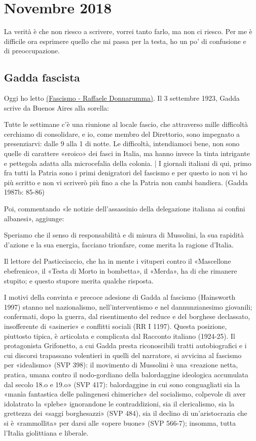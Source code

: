 \section{Novembre 2018}
La verità è che non riesco a scrivere, vorrei tanto farlo, ma non ci riesco. Per me è difficile ora esprimere quello che mi passa per la testa, ho un po' di confusione e di preoccupazione.
\newline
\subsection{Gadda fascista}
Oggi ho letto \href{http://www.gadda.ed.ac.uk/Pages/resources/walks/pge/fascismdonnaru.php}{(Fascismo - Raffaele Donnarumma)}.
Il 3 settembre 1923, Gadda scrive da Buenos Aires alla sorella:

Tutte le settimane c’è una riunione al locale fascio, che attraverso mille difficoltà cerchiamo di consolidare, e io, come membro del Direttorio, sono impegnato a presenziarvi: dalle 9 alla 1 di notte. Le difficoltà, intendiamoci bene, non sono quelle di carattere «eroico» dei fasci in Italia, ma hanno invece la tinta intrigante e pettegola adatta alla microcefalia della colonia. | I giornali italiani di qui, primo fra tutti la Patria sono i primi denigratori del fascismo e per questo io non vi ho più scritto e non vi scriverò più fino a che la Patria non cambi bandiera. (Gadda 1987b: 85-86)

Poi, commentando «le notizie dell’assassinio della delegazione italiana ai confini albanesi», aggiunge:

Speriamo che il senso di responsabilità e di misura di Mussolini, la sua rapidità d’azione e la sua energia, facciano trionfare, come merita la ragione d’Italia.

Il lettore del Pasticciaccio, che ha in mente i vituperi contro il «Mascellone ebefrenico», il «Testa di Morto in bombetta», il «Merda», ha di che rimanere stupito; e questo stupore merita qualche risposta.

I motivi della convinta e precoce adesione di Gadda al fascismo (Hainsworth 1997) stanno nel nazionalismo, nell’interventismo e nel dannunzianesimo giovanili; confermati, dopo la guerra, dal risentimento del reduce e del borghese declassato, insofferente di «asinerie» e conflitti sociali (RR I 1197). Questa posizione, piuttosto tipica, è articolata e complicata dal Racconto italiano (1924-25). Il protagonista Grifonetto, a cui Gadda presta riconoscibili tratti autobiografici e i cui discorsi trapassano volentieri in quelli del narratore, si avvicina al fascismo per «idealismo» (SVP 398): il movimento di Mussolini è una «reazione netta, pratica, umana contro il nodo-gordiano della balordaggine ideologica accumulata dal secolo 18.o e 19.o» (SVP 417): balordaggine in cui sono conguagliati sia la «manìa fantastica delle palingenesi chimeriche» del socialismo, colpevole di aver idolatrato la «plebe» ignorandone le contraddizioni, sia il clericalismo, sia la grettezza dei «saggi borghesazzi» (SVP 484), sia il declino di un’aristocrazia che si è «rammollita» per darsi alle «opere buone» (SVP 566-7); insomma, tutta l’Italia giolittiana e liberale.


